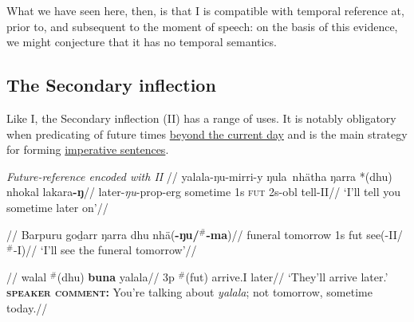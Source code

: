 What we have seen here, then, is that \gls{I} is compatible with temporal reference at, prior to, and subsequent to the moment of speech: on the basis of this evidence, we might conjecture that it has no temporal semantics. %

\subsection{The Secondary inflection}\label{desc-ii}

Like \gls{I}, the Secondary inflection (\gls{II}) has a range of uses. It is notably obligatory when predicating of future times \underline{beyond the current day} and is the main strategy for forming \underline{imperative sentences}.

\pex{} \textit{Future-reference encoded with \gls{II}}
\a{}\begingl\glpreamble {}//
\gla yalala-ŋu-mirri-y ŋula~nhätha ŋarra *(dhu) nhokal lakara\textbf{-ŋ}//
\glb later-\textit{ŋu}-\gls{prop}-\gls{erg} sometime 1s \textsc{fut} 2s-\gls{obl} tell-\gls{II}//
\glft`I'll tell you sometime later on'//
\endgl

\a\begingl\glpreamble{}//
\gla Barpuru goḏarr ŋarra dhu nhä(\textbf{-ŋu/$^\#$-ma})//
\glb funeral tomorrow 1s \gls{fut} see(-\gls{II}/$^\#$-\gls{I})//
\glft `I'll see the funeral tomorrow'\trailingcitation{[AW~20180730]}//\endgl

\a\begingl\glpreamble{}//
\gla walal $^\#$(dhu) \textbf{buna} yalala//
\glb 3p $^\#$(\gls{fut}) arrive.\gls{I} later//
\glft`They'll arrive later.'\\
\textsc{\textbf{speaker comment:}} You're talking about \textit{yalala}; not tomorrow, sometime today.//\endgl


\xe

